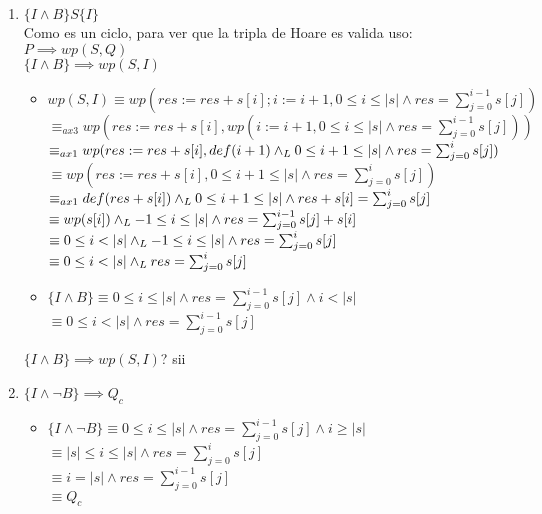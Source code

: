 \documentclass{article}
\begin{document}
\begin{itemize}
\begin{enumerate}
        \item $\{I \land B\}S\{I\}$ \\
        Como es un ciclo, para ver que la tripla de Hoare es valida uso: $P \implies wp(S, Q)$ \\
        $\{I \land B\} \implies wp(S, I)$ 
        \begin{itemize}
            \item $wp(S, I) \equiv wp(res := res + s[i]; i:= i + 1, 0 \leq i \leq |s| \land res = \sum_{j=0}^{i-1} s[j])$ \\
            $\equiv_{ax3} wp(res := res + s[i], wp(i:= i + 1, 0 \leq i \leq |s| \land res = \sum_{j=0}^{i-1} s[j]))$\\
            $\equiv_{ax1} wp(res := res + s[i], def(i + 1) \land _L 0 \leq i + 1 \leq |s| \land res = \sum_{j=0}^{i}s[j])$\\
            $\equiv wp(res := res + s[i], 0 \leq i + 1 \leq |s| \land res = \sum_{j=0}^{i}s[j])$\\
            $\equiv_{ax1} def(res + s[i]) \land _L 0 \leq i + 1 \leq |s| \land res + s[i] = \sum_{j=0}^{i}s[j]$\\
            $\equiv wp(s[i]) \land _L -1 \leq i \leq |s| \land res = \sum_{j=0}^{i-1} s[j] + s[i]$\\
            $\equiv 0 \leq i < |s| \land _L -1 \leq i \leq |s| \land res = \sum_{j=0}^{i} s[j]$\\
            $\equiv 0 \leq i < |s| \land _L res = \sum_{j=0}^{i} s[j]$
            \item $\{I \land B\} \equiv 0 \leq i \leq |s| \land res = \sum_{j=0}^{i-1} s[j] \land i < |s|$\\
            $\equiv 0 \leq i < |s| \land res = \sum_{j=0}^{i-1} s[j]$
        \end{itemize}
        $\{I \land B\} \implies wp(S, I)$? sii \checkmark
        \item $\{I \land \lnot B\} \implies Q_c$
        \begin{itemize}
            \item $\{I \land \lnot B\} \equiv 0 \leq i \leq |s| \land res = \sum_{j=0}^{i-1} s[j] \land i \geq |s|$\\
            $\equiv |s| \leq i \leq |s| \land res = \sum_{j=0}^{i}s[j]$\\
            $\equiv i = |s| \land res = \sum_{j=0}^{i-1} s[j]$\\
            $\equiv Q_c$ \checkmark
        \end{itemize}    
    \end{enumerate}
\end{itemize}
\end{document}
